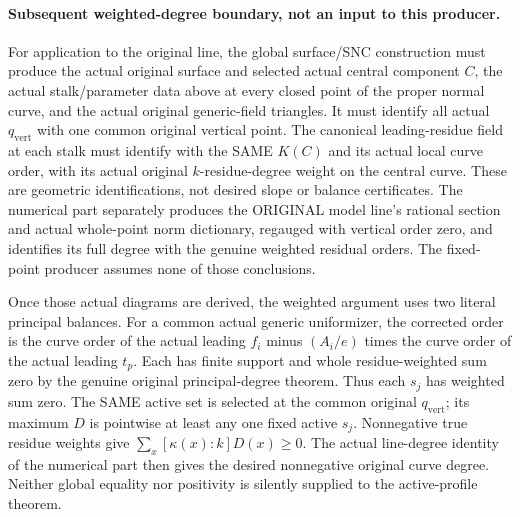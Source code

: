 \paragraph{Subsequent weighted-degree boundary, not an input to this producer.}
For application to the original line, the global surface/SNC construction must
produce the actual original surface and selected actual central component
$C$, the actual stalk/parameter data above at every closed point of the
proper normal curve, and the actual original generic-field triangles.
It must identify all actual $q_{\mathrm{vert}}$ with one common original vertical point.
The canonical leading-residue field at each stalk must identify with the
SAME $K(C)$ and its actual local curve order, with its actual original $k$-residue-degree
weight on the central curve. These are geometric identifications, not desired slope or balance
certificates. The numerical part separately produces the ORIGINAL model
line's rational section and actual whole-point norm dictionary, regauged
with vertical order zero, and identifies its full degree with the genuine
weighted residual orders. The fixed-point producer assumes none of those conclusions.

Once those actual diagrams are derived, the weighted argument uses two
literal principal balances. For a common actual generic uniformizer, the
corrected order is the curve order of the actual leading $f_i$ minus
$(A_i/e)$ times the curve order of the actual leading $t_p$. Each has finite
support and whole residue-weighted sum zero by the genuine original
principal-degree theorem. Thus each $s_j$ has weighted sum zero. The SAME
active set is selected at the common original $q_{\mathrm{vert}}$; its maximum $D$ is
pointwise at least any one fixed active $s_j$. Nonnegative true residue
weights give $\sum_x[\kappa(x):k]D(x)\ge0$. The actual line-degree identity of the
numerical part then gives the desired nonnegative original
curve degree. Neither global equality nor positivity is silently supplied
to the active-profile theorem.
